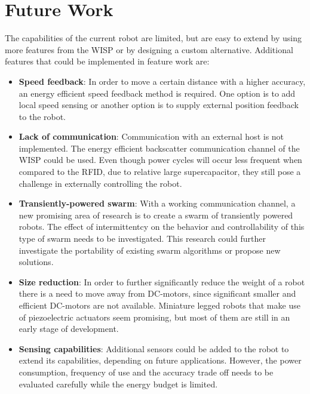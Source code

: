 \section{Future Work}
\label{sec:limitations_future_work}

The capabilities of the current robot are limited, but are easy to extend by using more features from the WISP or by designing a custom alternative.
Additional features that could be implemented in feature work are:

\begin{itemize}

\item \textbf{Speed feedback}: 
In order to move a certain distance with a higher accuracy, an energy efficient speed feedback method is required.
One option is to add local speed sensing or another option is to supply external position feedback to the robot.


\item \textbf{Lack of communication}: 
Communication with an external host is not implemented.
The energy efficient backscatter communication channel of the WISP could be used.
Even though power cycles will occur less frequent when compared to the RFID, due to relative large supercapacitor, they still pose a challenge in externally controlling the robot.

\item \textbf{Transiently-powered swarm}: 
With a working communication channel, a new promising area of research is to create a swarm of transiently powered robots.
The effect of intermittentcy on the behavior and controllability of this type of swarm needs to be investigated.
This research could further investigate the portability of existing swarm algorithms or propose new solutions.	

\item \textbf{Size reduction}: 
In order to further significantly reduce the weight of a robot there is a need to move away from DC-motors, since significant smaller and efficient DC-motors are not available.
Miniature legged robots that make use of piezoelectric actuators seem promising, but most of them are still in an early stage of development.

\item \textbf{Sensing capabilities}: 
Additional sensors could be added to the robot to extend its capabilities, depending on future applications.
However, the power consumption, frequency of use and the accuracy trade off needs to be evaluated carefully while the energy budget is limited.


\end{itemize}

